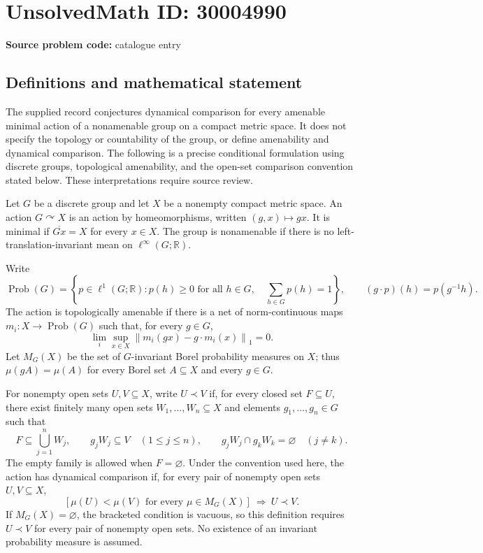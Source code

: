\documentclass[11pt]{article}
\newcommand{\R}{\mathbb{R}}
\begin{document}
\section*{UnsolvedMath ID: 30004990}
\textbf{Source problem code:} catalogue entry
\subsection{Definitions and mathematical statement}
The supplied record conjectures dynamical comparison for every amenable minimal action of a nonamenable group on a compact metric space. It does not specify the topology or countability of the group, or define amenability and dynamical comparison. The following is a precise conditional formulation using discrete groups, topological amenability, and the open-set comparison convention stated below. These interpretations require source review.

Let \(G\) be a discrete group and let \(X\) be a nonempty compact metric space. An action \(G\curvearrowright X\) is an action by homeomorphisms, written \((g,x)\mapsto gx\). It is minimal if \(\overline{Gx}=X\) for every \(x\in X\). The group is nonamenable if there is no left-translation-invariant mean on \(\ell^\infty(G;\R)\).

Write
\[
\operatorname{Prob}(G)=\left\{p\in\ell^1(G;\R):p(h)\geq 0\text{ for all }h\in G,\quad \sum_{h\in G}p(h)=1\right\},
\qquad (g\cdot p)(h)=p(g^{-1}h).
\]
The action is topologically amenable if there is a net of norm-continuous maps \(m_i:X\to\operatorname{Prob}(G)\) such that, for every \(g\in G\),
\[
\lim_i\sup_{x\in X}\left\|m_i(gx)-g\cdot m_i(x)\right\|_1=0.
\]
Let \(M_G(X)\) be the set of \(G\)-invariant Borel probability measures on \(X\); thus \(\mu(gA)=\mu(A)\) for every Borel set \(A\subseteq X\) and every \(g\in G\).

For nonempty open sets \(U,V\subseteq X\), write \(U\prec V\) if, for every closed set \(F\subseteq U\), there exist finitely many open sets \(W_1,\ldots,W_n\subseteq X\) and elements \(g_1,\ldots,g_n\in G\) such that
\[
F\subseteq\bigcup_{j=1}^{n}W_j,\qquad g_jW_j\subseteq V\quad(1\leq j\leq n),\qquad g_jW_j\cap g_kW_k=\varnothing\quad(j\neq k).
\]
The empty family is allowed when \(F=\varnothing\). Under the convention used here, the action has dynamical comparison if, for every pair of nonempty open sets \(U,V\subseteq X\),
\[
\left[\mu(U)<\mu(V)\text{ for every }\mu\in M_G(X)\right]\ \Longrightarrow\ U\prec V.
\]
If \(M_G(X)=\varnothing\), the bracketed condition is vacuous, so this definition requires \(U\prec V\) for every pair of nonempty open sets. No existence of an invariant probability measure is assumed.
\end{document}
